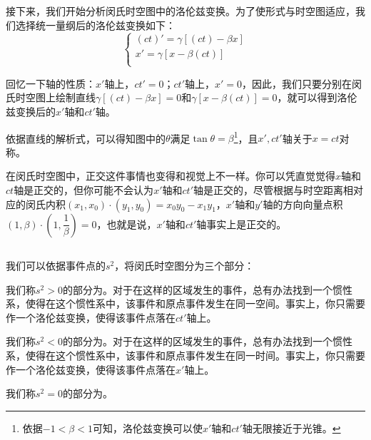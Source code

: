 接下来，我们开始分析闵氏时空图中的洛伦兹变换。为了使形式与时空图适应，我们选择统一量纲后的洛伦兹变换如下：
\[\left\{\begin{array}{l}
	(ct)'=\gamma[(ct)-\beta x]\\
	x'=\gamma[x-\beta(ct)]\\
\end{array}\right.\]

回忆一下轴的性质：$x'$轴上，$ct'=0$；$ct'$轴上，$x'=0$，因此，我们只要分别在闵氏时空图上绘制直线$\gamma[(ct)-\beta x]=0$和$ \gamma[x-\beta(ct)]=0$，就可以得到洛伦兹变换后的$x'$轴和$ct'$轴。

依据直线的解析式，可以得知图中的$\theta$满足$\tan\theta = \beta$\footnote{依据$-1<\beta<1$可知，洛伦兹变换可以使$x'$轴和$ct'$轴无限接近于光锥。}，且$x',ct'$轴关于$x=ct$对称。

在闵氏时空图中，正交这件事情也变得和视觉上不一样。你可以凭直觉觉得$x$轴和$ct$轴是正交的，但你可能不会认为$x'$轴和$ct'$轴是正交的，尽管根据与时空距离相对应的闵氏内积$(x_1,x_0)\cdot(y_1,y_0)=x_0y_0-x_1y_1$，$x'$轴和$y'$轴的方向向量点积$(1,\beta)\cdot(1,\dfrac{1}{\beta})=0$，也就是说，$x'$轴和$ct'$轴事实上是正交的。

\subsection[时序和因果关系]{}
我们可以依据事件点的$s^2$，将闵氏时空图分为三个部分：
\begin{Itemize}
	\item {} 我们称$s^2>0$的部分为。对于在这样的区域发生的事件，总有办法找到一个惯性系，使得在这个惯性系中，该事件和原点事件发生在同一空间。事实上，你只需要作一个洛伦兹变换，使得该事件点落在$ct'$轴上。
	\item  {} 我们称$s^2<0$的部分为。对于在这样的区域发生的事件，总有办法找到一个惯性系，使得在这个惯性系中，该事件和原点事件发生在同一时间。事实上，你只需要作一个洛伦兹变换，使得该事件点落在$x'$轴上。
	\item {} 我们称$s^2=0$的部分为。
\end{Itemize}

